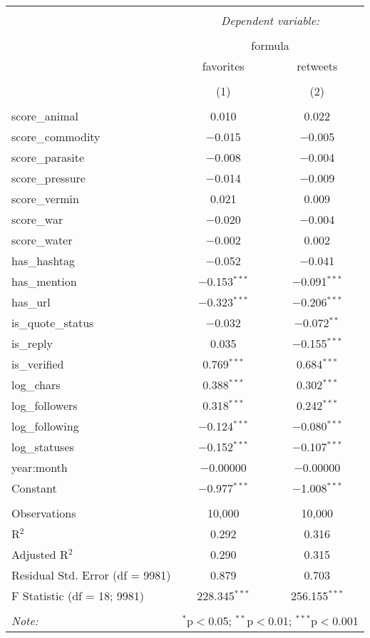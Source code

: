 
\begin{table}[!htbp] \centering 
  \caption{} 
  \label{} 
\begin{tabular}{@{\extracolsep{5pt}}lcc} 
\\[-1.8ex]\hline 
\hline \\[-1.8ex] 
 & \multicolumn{2}{c}{\textit{Dependent variable:}} \\ 
\cline{2-3} 
\\[-1.8ex] & \multicolumn{2}{c}{formula} \\ 
 & favorites & retweets \\ 
\\[-1.8ex] & (1) & (2)\\ 
\hline \\[-1.8ex] 
 score\_animal & 0.010 & 0.022 \\ 
  score\_commodity & $-$0.015 & $-$0.005 \\ 
  score\_parasite & $-$0.008 & $-$0.004 \\ 
  score\_pressure & $-$0.014 & $-$0.009 \\ 
  score\_vermin & 0.021 & 0.009 \\ 
  score\_war & $-$0.020 & $-$0.004 \\ 
  score\_water & $-$0.002 & 0.002 \\ 
  has\_hashtag & $-$0.052 & $-$0.041 \\ 
  has\_mention & $-$0.153$^{***}$ & $-$0.091$^{***}$ \\ 
  has\_url & $-$0.323$^{***}$ & $-$0.206$^{***}$ \\ 
  is\_quote\_status & $-$0.032 & $-$0.072$^{**}$ \\ 
  is\_reply & 0.035 & $-$0.155$^{***}$ \\ 
  is\_verified & 0.769$^{***}$ & 0.684$^{***}$ \\ 
  log\_chars & 0.388$^{***}$ & 0.302$^{***}$ \\ 
  log\_followers & 0.318$^{***}$ & 0.242$^{***}$ \\ 
  log\_following & $-$0.124$^{***}$ & $-$0.080$^{***}$ \\ 
  log\_statuses & $-$0.152$^{***}$ & $-$0.107$^{***}$ \\ 
  year:month & $-$0.00000 & $-$0.00000 \\ 
  Constant & $-$0.977$^{***}$ & $-$1.008$^{***}$ \\ 
 \hline \\[-1.8ex] 
Observations & 10,000 & 10,000 \\ 
R$^{2}$ & 0.292 & 0.316 \\ 
Adjusted R$^{2}$ & 0.290 & 0.315 \\ 
Residual Std. Error (df = 9981) & 0.879 & 0.703 \\ 
F Statistic (df = 18; 9981) & 228.345$^{***}$ & 256.155$^{***}$ \\ 
\hline 
\hline \\[-1.8ex] 
\textit{Note:}  & \multicolumn{2}{r}{$^{*}$p$<$0.05; $^{**}$p$<$0.01; $^{***}$p$<$0.001} \\ 
\end{tabular} 
\end{table} 
